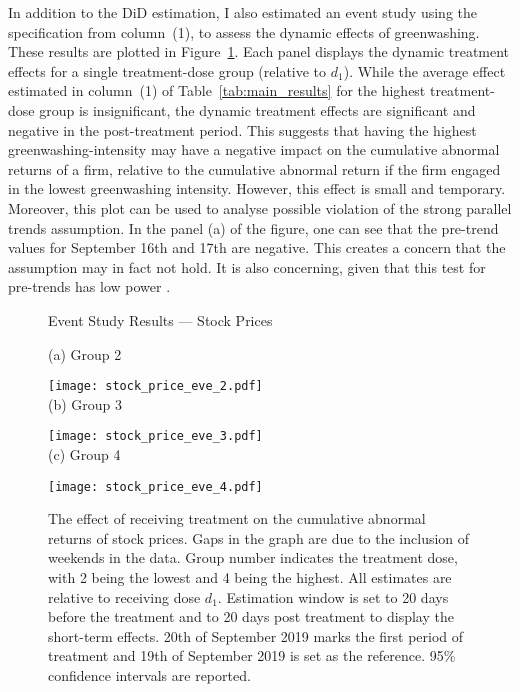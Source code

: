 \documentclass[12pt]{article}
\begin{document}
In addition to the DiD estimation, I also estimated an event study using the specification from column~(1), to assess the dynamic effects of greenwashing. These results are plotted in Figure~\ref{fig:eve_stock}. Each panel displays the dynamic treatment effects for a single treatment-dose group (relative to $d_1$). While the average effect estimated in column~(1) of Table~\ref{tab:main_results} for the highest treatment-dose group is insignificant, the dynamic treatment effects are significant and negative in the post-treatment period. This suggests that having the highest greenwashing-intensity may have a negative impact on the cumulative abnormal returns of a firm, relative to the cumulative abnormal return if the firm engaged in the lowest greenwashing intensity. However, this effect is small and temporary. Moreover, this plot can be used to analyse possible violation of the strong parallel trends assumption. In the panel (a) of the figure, one can see that the pre-trend values for September 16th and 17th are negative. This creates a concern that the assumption may in fact not hold. It is also concerning, given that this test for pre-trends has low power \parencite{rothWhatsTrendingDifferenceindifferences2023}.
                            
\begin{figure}
    \caption{Event Study Results --- Stock Prices}\label{fig:eve_stock}
    \centering
    
    (a) Group 2
    
    \texttt{[image: stock\_price\_eve\_2.pdf]} \\
    
    (b) Group 3
    
    \texttt{[image: stock\_price\_eve\_3.pdf]} \\
    
    (c) Group 4
    
    \texttt{[image: stock\_price\_eve\_4.pdf]}
    
    \captionsetup{font=footnotesize}
    \caption*{The effect of receiving treatment on the cumulative abnormal returns of stock prices. Gaps in the graph are due to the inclusion of weekends in the data. Group number indicates the treatment dose, with 2 being the lowest and 4 being the highest. All estimates are relative to receiving dose $d_1$. Estimation window is set to 20 days before the treatment and to 20 days post treatment to display the short-term effects. 20th of September 2019 marks the first period of treatment and 19th of September 2019 is set as the reference. 95\% confidence intervals are reported.}
\end{figure}
\end{document}
